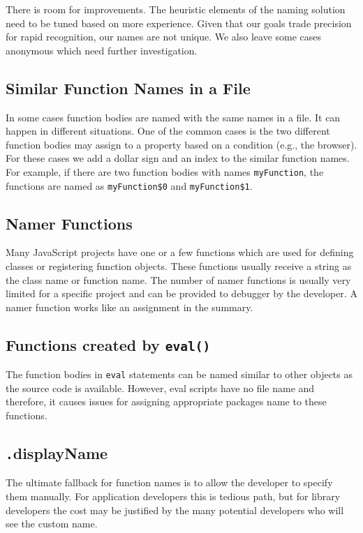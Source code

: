 \documentclass[10pt, preprint]{sigplanconf}
\begin{document}
There is room for improvements. The heuristic elements of the naming solution need to be tuned based on more experience.  Given that our goals trade precision for rapid recognition, our names are not unique. We also leave some cases anonymous which need further investigation. 


\subsection{Similar Function Names in a File}
In some cases function bodies are named with the same names in a file. It can happen in different situations. One of the common cases is the two different function bodies may assign to a property based on a condition (e.g., the browser). For these cases we add a dollar sign and an index to the similar function names. For example, if there are two function bodies with names {\small\texttt{myFunction}}, the functions are named as {\small\texttt{myFunction\$0}} and {\small\texttt{myFunction\$1}}. 

\subsection{Namer Functions}
Many JavaScript projects have one or a few functions which are used for defining classes or registering function objects. These functions usually receive a string as the class name or function name. The number of namer functions is usually very limited for a specific project and can be provided to debugger by the developer. A namer function works like an assignment in the summary.  



\subsection{Functions created by {\large \texttt{eval()}}}
The function bodies in {\small\texttt{eval}} statements can be named similar to other objects as the source code is available. However, eval scripts have no file name and therefore, it causes issues for assigning appropriate packages name to these functions. 

\subsection{ {\texttt .displayName} }
The ultimate fallback for function names is to allow the developer to specify them manually. For application developers this is tedious path, but for library developers the cost may be justified by the many potential developers who will see the custom name.
\end{document}
